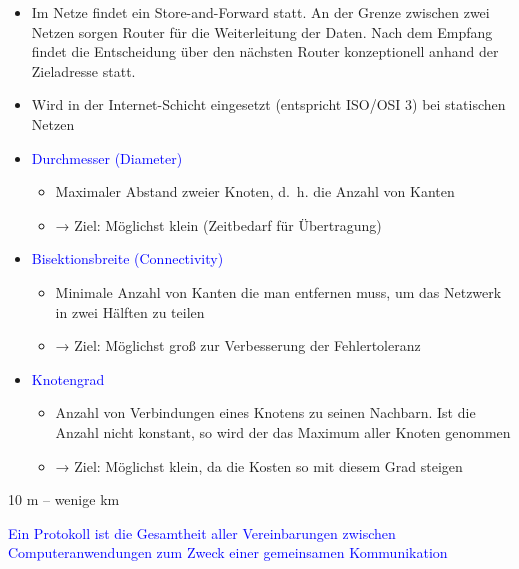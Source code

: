 \begin{itemize}
    \item Im Netze findet ein Store-and-Forward statt.
    An der Grenze zwischen zwei Netzen sorgen Router für die Weiterleitung der Daten.
    Nach dem Empfang findet die Entscheidung über den nächsten Router konzeptionell anhand der Zieladresse statt.
    \item Wird in der Internet-Schicht eingesetzt (entspricht ISO/OSI 3) bei statischen Netzen
\end{itemize}

\begin{itemize}
    \item \textcolor{blue}{Durchmesser (Diameter)}
    \begin{itemize}
        \item Maximaler Abstand zweier Knoten, d.\ h. die Anzahl von Kanten
        \item → Ziel: Möglichst klein (Zeitbedarf für Übertragung)
    \end{itemize}
    \item \textcolor{blue}{Bisektionsbreite (Connectivity)}
    \begin{itemize}
        \item Minimale Anzahl von Kanten die man entfernen muss, um das Netzwerk in zwei Hälften zu teilen
        \item → Ziel: Möglichst groß zur Verbesserung der Fehlertoleranz
    \end{itemize}
    \item \textcolor{blue}{Knotengrad}
    \begin{itemize}
        \item Anzahl von Verbindungen eines Knotens zu seinen Nachbarn.
        Ist die Anzahl nicht konstant, so wird der das Maximum aller Knoten genommen
        \item → Ziel: Möglichst klein, da die Kosten so mit diesem Grad steigen
    \end{itemize}
\end{itemize}

10 m – wenige km

\textcolor{blue}{Ein Protokoll ist die Gesamtheit aller Vereinbarungen zwischen Computeranwendungen zum Zweck einer gemeinsamen Kommunikation}


